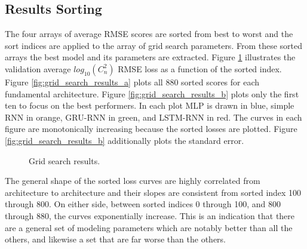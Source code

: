 \subsection{Results Sorting}
The four arrays of average RMSE scores are sorted from best to worst and the sort indices are applied to the array of grid search parameters. From these sorted arrays the best model and its parameters are extracted. Figure \ref{fig:grid_search_results} illustrates the validation average $log_{10}(C_{n}^{2})$ RMSE loss as a function of the sorted index. Figure \ref{fig:grid_search_results_a} plots all 880 sorted scores for each fundamental architecture. Figure \ref{fig:grid_search_results_b} plots only the first ten to focus on the best performers. In each plot \ac{MLP} is drawn in blue, simple \ac{RNN} in orange, \ac{GRU-RNN} in green, and \ac{LSTM-RNN} in red. The curves in each figure are monotonically increasing because the sorted losses are plotted. Figure \ref{fig:grid_search_results_b} additionally plots the standard error.
\begin{figure}[h!]
	\centering
	\hfill
	\caption{Grid search results.}
	\label{fig:grid_search_results}
\end{figure}
The general shape of the sorted loss curves are highly correlated from architecture to architecture and their slopes are consistent from sorted index 100 through 800. On either side, between sorted indices 0 through 100, and 800 through 880, the curves exponentially increase. This is an indication that there are a general set of modeling parameters which are notably better than all the others, and likewise a set that are far worse than the others.

